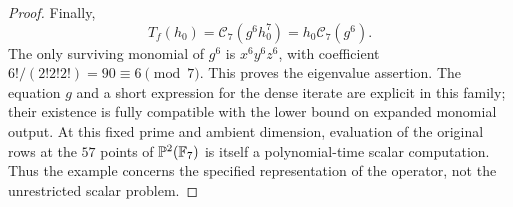 \begin{proof}
Finally,
\[
 T_f(h_0)=\mathcal C_7(g^6h_0^7)
          =h_0\mathcal C_7(g^6).
\]
The only surviving monomial of $g^6$ is $x^6y^6z^6$, with coefficient
$6!/(2!2!2!)=90\equiv6\pmod7$. This proves the eigenvalue assertion.
The equation $g$ and a short expression for the dense iterate are
explicit in this family; their existence is fully compatible with
the lower bound on expanded monomial output.
At this fixed prime and ambient dimension, evaluation of the original
rows at the $57$ points of $\mathbb P^2(\mathbb F_7)$ is itself a
polynomial-time scalar computation. Thus the example concerns the
specified representation of the operator, not the unrestricted scalar
problem.
\end{proof}
